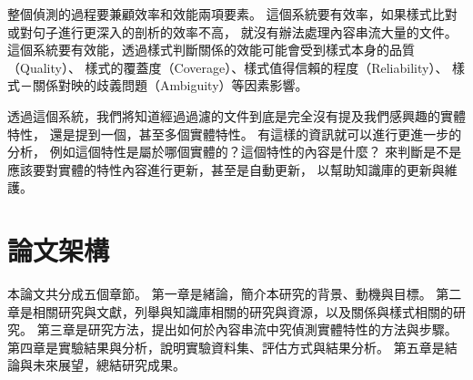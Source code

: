 整個偵測的過程要兼顧效率和效能兩項要素。
這個系統要有效率，如果樣式比對或對句子進行更深入的剖析的效率不高，
就沒有辦法處理內容串流大量的文件。
這個系統要有效能，透過樣式判斷關係的效能可能會受到樣式本身的品質（Quality）、
樣式的覆蓋度（Coverage）、樣式值得信賴的程度（Reliability）、
樣式－關係對映的歧義問題（Ambiguity）等因素影響。

透過這個系統，我們將知道經過過濾的文件到底是完全沒有提及我們感興趣的實體特性，
還是提到一個，甚至多個實體特性。
有這樣的資訊就可以進行更進一步的分析，
例如這個特性是屬於哪個實體的？這個特性的內容是什麼？
來判斷是不是應該要對實體的特性內容進行更新，甚至是自動更新，
以幫助知識庫的更新與維護。

%
%
\section{論文架構}
本論文共分成五個章節。
第一章是緒論，簡介本研究的背景、動機與目標。
第二章是相關研究與文獻，列舉與知識庫相關的研究與資源，以及關係與樣式相關的研究。
第三章是研究方法，提出如何於內容串流中究偵測實體特性的方法與步驟。
第四章是實驗結果與分析，說明實驗資料集、評估方式與結果分析。
第五章是結論與未來展望，總結研究成果。

